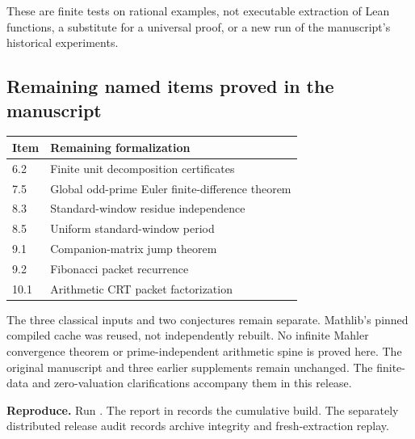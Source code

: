 These are finite tests on rational examples, not executable extraction of Lean functions, a substitute for a universal proof, or a new run of the manuscript's historical experiments.

\subsection*{Remaining named items proved in the manuscript}
\begin{center}
\begin{tabular}{@{}ll@{}}\toprule
Item & Remaining formalization\\\midrule
6.2 & Finite unit decomposition certificates\\
7.5 & Global odd-prime Euler finite-difference theorem\\
8.3 & Standard-window residue independence\\
8.5 & Uniform standard-window period\\
9.1 & Companion-matrix jump theorem\\
9.2 & Fibonacci packet recurrence\\
10.1 & Arithmetic CRT packet factorization\\\bottomrule
\end{tabular}
\end{center}
The three classical inputs and two conjectures remain separate. Mathlib's pinned compiled cache was reused, not independently rebuilt. No infinite Mahler convergence theorem or prime-independent arithmetic spine is proved here. The original manuscript and three earlier supplements remain unchanged. The finite-data and zero-valuation clarifications accompany them in this release.

\textbf{Reproduce.} Run . The report in  records the cumulative build. The separately distributed release audit records archive integrity and fresh-extraction replay.
